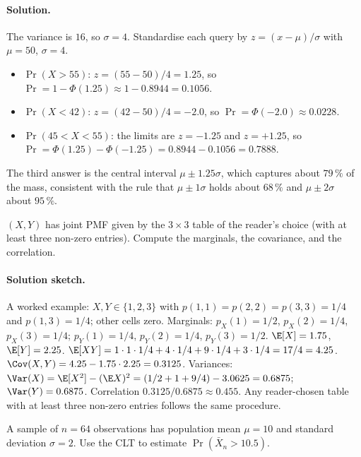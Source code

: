 \paragraph{Solution.}
The variance is $16$, so $\sigma = 4$. Standardise each query by
$z = (x - \mu)/\sigma$ with $\mu = 50$, $\sigma = 4$.
\begin{itemize}[leftmargin=*]
  \item $\Pr(X > 55)$: $z = (55 - 50)/4 = 1.25$, so
    $\Pr = 1 - \Phi(1.25) \approx 1 - 0.8944 = 0.1056$.
  \item $\Pr(X < 42)$: $z = (42 - 50)/4 = -2.0$, so
    $\Pr = \Phi(-2.0) \approx 0.0228$.
  \item $\Pr(45 < X < 55)$: the limits are $z = -1.25$ and
    $z = +1.25$, so $\Pr = \Phi(1.25) - \Phi(-1.25) = 0.8944 -
    0.1056 = 0.7888$.
\end{itemize}
The third answer is the central interval $\mu \pm 1.25\sigma$, which
captures about $79\,\%$ of the mass, consistent with the rule that
$\mu \pm 1\sigma$ holds about $68\,\%$ and $\mu \pm 2\sigma$ about
$95\,\%$.

\begin{exercise}
$(X, Y)$ has joint PMF given by the $3 \times 3$ table of the
reader's choice (with at least three non-zero entries). Compute
the marginals, the covariance, and the correlation.
\end{exercise}

\paragraph{Solution sketch.}
A worked example: $X, Y \in \{1, 2, 3\}$ with $p(1,1) = p(2,2) =
p(3,3) = 1/4$ and $p(1,3) = 1/4$; other cells zero. Marginals:
$p_{X}(1) = 1/2$, $p_{X}(2) = 1/4$, $p_{X}(3) = 1/4$; $p_{Y}(1) =
1/4$, $p_{Y}(2) = 1/4$, $p_{Y}(3) = 1/2$. $\E[X] = 1.75$, $\E[Y] =
2.25$. $\E[XY] = 1 \cdot 1 \cdot 1/4 + 4 \cdot 1/4 + 9 \cdot 1/4 +
3 \cdot 1/4 = 17/4 = 4.25$. $\Cov(X, Y) = 4.25 - 1.75 \cdot 2.25 =
0.3125$. Variances: $\Var(X) = \E[X^{2}] - (\E X)^{2} = (1/2 + 1 +
9/4) - 3.0625 = 0.6875$; $\Var(Y) = 0.6875$. Correlation
$0.3125/0.6875 \approx 0.455$. Any reader-chosen table with at
least three non-zero entries follows the same procedure.

\begin{exercise}
A sample of $n = 64$ observations has population mean
$\mu = 10$ and standard deviation $\sigma = 2$. Use the CLT to
estimate $\Pr(\bar X_{n} > 10.5)$.
\end{exercise}

